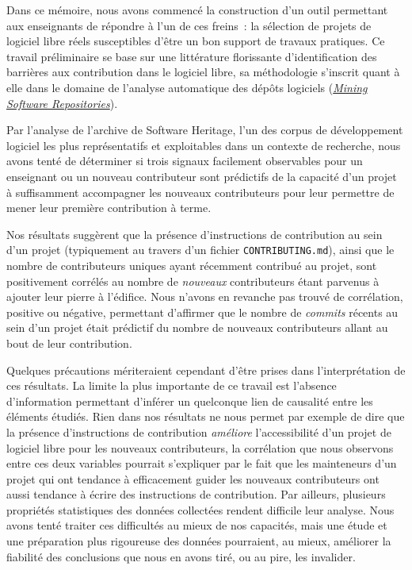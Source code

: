 \documentclass[dvipsnames,runningheads]{llncs}
\newcommand{\en}[1]{\foreignlanguage{english}{\emph{#1}}}
\begin{document}
    Dans ce mémoire, nous avons commencé la construction d'un outil permettant aux enseignants de répondre à
    l'un de ces freins : la sélection de projets de logiciel libre réels susceptibles d'être un bon support de
    travaux pratiques. Ce travail préliminaire se base sur une littérature florissante d'identification des
    barrières aux contribution dans le logiciel libre, sa méthodologie s'inscrit quant à elle dans le domaine
    de l'analyse automatique des dépôts logiciels (\href{https://conf.researchr.org/series/msr}{\en{Mining
    Software Repositories}}).

    Par l'analyse de l'archive de Software Heritage, l'un des corpus de développement logiciel les plus
    représentatifs et exploitables dans un contexte de recherche, nous avons tenté de déterminer si trois
    signaux facilement observables pour un enseignant ou un nouveau contributeur sont prédictifs de la
    capacité d'un projet à suffisamment accompagner les nouveaux contributeurs pour leur permettre de mener
    leur première contribution à terme.

    Nos résultats suggèrent que la présence d'instructions de contribution au sein d'un projet (typiquement au
    travers d'un fichier \texttt{CONTRIBUTING.md}), ainsi que le nombre de contributeurs uniques ayant
    récemment contribué au projet, sont positivement corrélés au nombre de \emph{nouveaux} contributeurs étant
    parvenus à ajouter leur pierre à l'édifice. Nous n'avons en revanche pas trouvé de corrélation, positive
    ou négative, permettant d'affirmer que le nombre de \en{commits} récents au sein d'un projet était
    prédictif du nombre de nouveaux contributeurs allant au bout de leur contribution.

    Quelques précautions mériteraient cependant d'être prises dans l'interprétation de ces résultats. La
    limite la plus importante de ce travail est l'absence d'information permettant d'inférer un quelconque
    lien de causalité entre les éléments étudiés. Rien dans nos résultats ne nous permet par exemple de dire
    que la présence d'instructions de contribution \emph{améliore} l'accessibilité d'un projet de logiciel
    libre pour les nouveaux contributeurs, la corrélation que nous observons entre ces deux variables pourrait
    s'expliquer par le fait que les mainteneurs d'un projet qui ont tendance à efficacement guider les
    nouveaux contributeurs ont aussi tendance à écrire des instructions de contribution. Par ailleurs,
    plusieurs propriétés statistiques des données collectées rendent difficile leur analyse. Nous avons tenté
    traiter ces difficultés au mieux de nos capacités, mais une étude et une préparation plus rigoureuse des
    données pourraient, au mieux, améliorer la fiabilité des conclusions que nous en avons tiré, ou au pire,
    les invalider.
\end{document}
